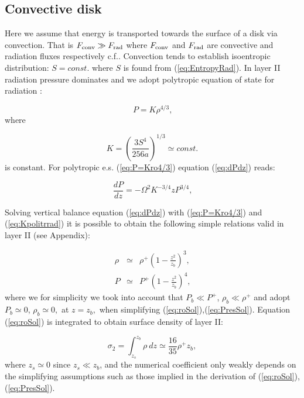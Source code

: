 \documentclass[12pt,english,preprint]{aastex}
\begin{document}
\subsection{Convective disk}

Here we assume that energy is transported towards the surface of a
disk via convection. That is $F_{{\rm conv}}\gg F_{{\rm rad}}$ where
$F_{{\rm conv}}$ and $F_{{\rm rad}}$ are convective and radiation
fluxes respectively c.f.. Convection tends to establish isoentropic
distribution: $S=const.$ where $S$ is found from (\ref{eq:EntropyRad}).
In layer II radiation pressure dominates and we adopt polytropic equation
of state for radiation \citet{BKBlinn77}:

\begin{equation}
P=K\rho^{4/3}\mbox{,}\label{eq:P=Kro4/3}
\end{equation}
where

\begin{equation}
K=\left(\frac{3S^{4}}{256a}\right)^{1/3}\simeq const.\label{eq:Kpolitrrad}
\end{equation}
is constant. For polytropic e.s. (\ref{eq:P=Kro4/3})
equation (\ref{eq:dPdz}) reads:

\begin{equation}
\frac{dP}{dz}=-\Omega^{2}K^{-3/4}zP^{3/4}\mbox{,}\label{eq:dPdZAdiab}
\end{equation}

Solving vertical balance equation (\ref{eq:dPdz}) with (\ref{eq:P=Kro4/3})
and (\ref{eq:Kpolitrrad}) it is possible to obtain the following
simple relations valid in layer II (see Appendix):

\begin{eqnarray}
\rho & \simeq & \rho^{+}\left(1-\frac{z^{2}}{z_{b}}\right)^{3}\mbox{,}\label{eq:roSol}\\
P & \simeq & P^{+}\left(1-\frac{z^{2}}{z_{b}}\right)^{4}\mbox{,}\label{eq:PresSol}
\end{eqnarray}
where we for simplicity we took into account that $P_{b}\ll P^{+}$,
$\rho_{b}\ll\rho^{+}$ and adopt $P_{b}\simeq0$, $\rho_{b}\simeq0,$
at $z=z_{b},$ when simplifying (\ref{eq:roSol}),(\ref{eq:PresSol}).
Equation (\ref{eq:roSol}) is integrated to obtain surface density
of layer II:

\[
\sigma_{2}=\int_{z_{s}}^{z_{b}}\rho\:dz\simeq\frac{16}{35}\rho^{+}z_{b},
\]
where $z_{s}\simeq0$ since $z_{s}\ll z_{b}$, and the numerical coefficient
only weakly depends on the simplifying assumptions such as those implied
in the derivation of (\ref{eq:roSol}),(\ref{eq:PresSol}).
\end{document}
